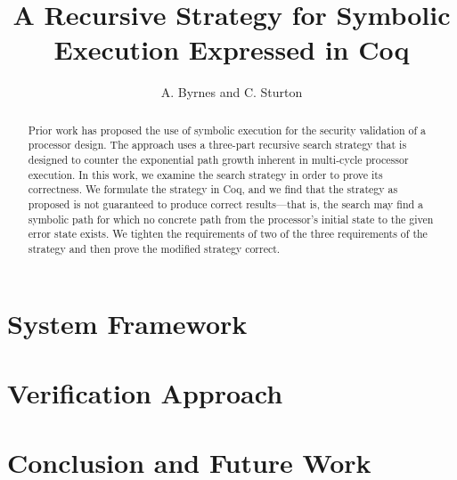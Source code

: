 \documentclass[a4paper]{article}
\title{A Recursive Strategy for Symbolic Execution Expressed in Coq}
\author{A. Byrnes and C. Sturton}
\begin{document}
\maketitle

\begin{abstract}
Prior work has proposed the use of symbolic execution for the security
validation of a processor design. The approach uses a three-part recursive search strategy
that is designed to counter the exponential path growth inherent in multi-cycle
processor execution. In this work, we examine the search strategy in order to prove its correctness. We formulate the
strategy in Coq, and we find that the
strategy as proposed is not guaranteed to produce correct results---that is, the
search may find a symbolic path for which no concrete path from the processor's initial state
to the given error state exists. We tighten the requirements of two of the three
requirements of the strategy and then prove the modified strategy correct. 
\end{abstract}




\section{System Framework}
\section{Verification Approach}
\section{Conclusion and Future Work}






\end{document}
